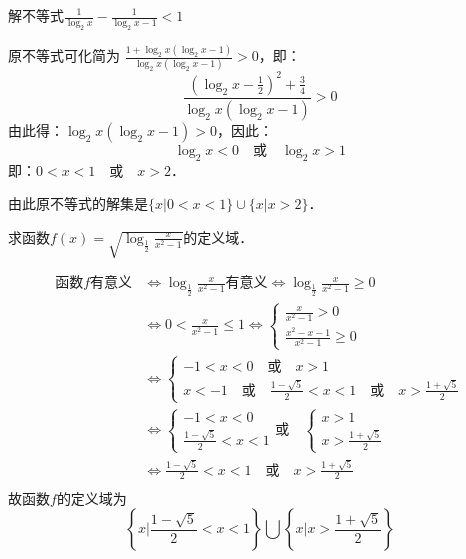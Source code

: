 \begin{example}
  解不等式$\frac{1}{\log_2 x}-\frac{1}{\log_2 x-1}<1$
\end{example}

\begin{solution}
  原不等式可化简为 $\frac{1+\log_2 x(\log_2 x-1)}{\log_2 x(\log_2 x-1)}>0$，即：
\[\frac{\left(\log_2 x-\frac{1}{2}\right)^2+\frac{3}{4}}{\log_2 x(\log_2 x-1)}>0\]
由此得：$\log_2 x(\log_2 x-1)>0$，因此：
\[\log_2 x<0\quad \text{或}\quad \log_2 x>1\]
即：$0<x<1\quad \text{或}\quad x>2$．

由此原不等式的解集是$\{x|0<x<1\}\cup\{x|x>2\}$．
\end{solution}

\begin{example}
  求函数$f(x)=\sqrt{\log_{\tfrac{1}{2}}\frac{x}{x^2-1}}$的定义域．
\end{example}

\begin{solution}
\[\begin{split}
  \text{函数$f$有意义}&\Longleftrightarrow \log_{\tfrac{1}{2}}\frac{x}{x^2-1}\text{有意义}\Longleftrightarrow \log_{\tfrac{1}{2}}\frac{x}{x^2-1}\ge 0\\
  &\Longleftrightarrow  0<   \frac{x}{x^2-1}\le 1    \Longleftrightarrow  \begin{cases}
    \frac{x}{x^2-1}>0\\ \frac{x^2-x-1}{x^2-1}\ge 0
  \end{cases}           \\
  &\Longleftrightarrow     \begin{cases}
    -1<x<0\quad \text{或}\quad x>1\\
    x<-1\quad \text{或}\quad \frac{1-\sqrt{5}}{2}<x<1\quad \text{或}\quad x>\frac{1+\sqrt{5}}{2}
  \end{cases}               \\
  &\Longleftrightarrow   \begin{cases}
    -1<x<0\\  \frac{1-\sqrt{5}}{2}<x<1
  \end{cases}      \text{或}\quad  \begin{cases}
    x>1\\x>\frac{1+\sqrt{5}}{2}
  \end{cases}           \\
  &\Longleftrightarrow    \frac{1-\sqrt{5}}{2}<x<1  \quad \text{或}\quad   x>\frac{1+\sqrt{5}}{2}   \\
\end{split}\]
故函数$f$的定义域为
\[\left\{x\Big| \frac{1-\sqrt{5}}{2}<x<1 \right\}\bigcup\left\{x\Big|x>\frac{1+\sqrt{5}}{2}  \right\}\]
\end{solution}



